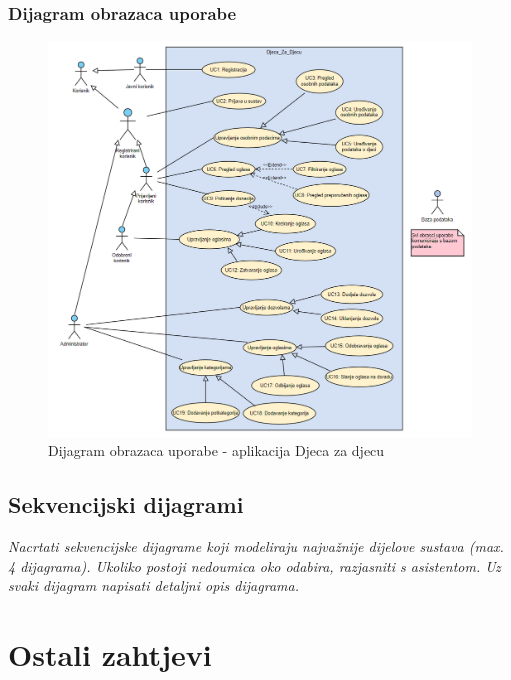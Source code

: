 				\subsubsection{Dijagram obrazaca uporabe}
					\begin{figure}[H]
						\includegraphics[width=\textwidth,height=0.7\textheight]{dijagrami/UCD - Djeca za djecu.png}
						\centering
						\caption{Dijagram obrazaca uporabe - aplikacija Djeca za djecu}
						\label{fig:useCaseDiagramMain}
					\end{figure}
				\eject
				
			\subsection{Sekvencijski dijagrami}
				
				
				\textit{Nacrtati sekvencijske dijagrame koji modeliraju najvažnije dijelove sustava (max. 4 dijagrama). Ukoliko postoji nedoumica oko odabira, razjasniti s asistentom. Uz svaki dijagram napisati detaljni opis dijagrama.}
				\eject
	
		\section{Ostali zahtjevi}
		
		 